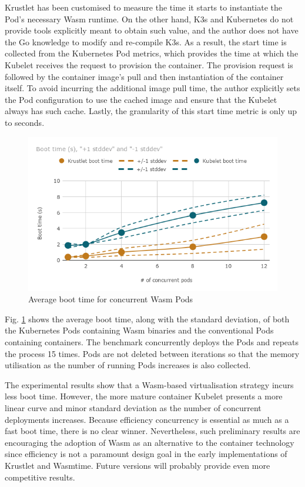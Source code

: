 Krustlet has been customised to measure the time it starts to instantiate the Pod's necessary Wasm runtime. On the other hand, K3s and Kubernetes do not provide tools explicitly meant to obtain such value, and the author does not have the Go knowledge to modify and re-compile K3s. As a result, the start time is collected from the Kubernetes Pod metrics, which provides the time at which the Kubelet receives the request to provision the container. The provision request is followed by the container image's pull and then instantiation of the container itself. To avoid incurring the additional image pull time, the author explicitly sets the Pod configuration to use the cached image and ensure that the Kubelet always has such cache. Lastly, the granularity of this start time metric is only up to seconds.

\begin{figure}[ht]
\centering
\includegraphics[width=\columnwidth]{figures/b-krustlet-1}
\caption{Average boot time for concurrent Wasm Pods \label{fig:b-krustlet-1}}
\end{figure}

Fig. \ref{fig:b-krustlet-1} shows the average boot time, along with the standard deviation, of both the Kubernetes Pods containing Wasm binaries and the conventional Pods containing containers. The benchmark concurrently deploys the Pods and repeats the process 15 times. Pods are not deleted between iterations so that the memory utilisation as the number of running Pods increases is also collected.

The experimental results show that a Wasm-based virtualisation strategy incurs less boot time. However, the more mature container Kubelet presents a more linear curve and minor standard deviation as the number of concurrent deployments increases. Because efficiency concurrency is essential as much as a fast boot time, there is no clear winner. Nevertheless, such preliminary results are encouraging the adoption of Wasm as an alternative to the container technology since efficiency is not a paramount design goal in the early implementations of Krustlet and Wasmtime. Future versions will probably provide even more competitive results.

